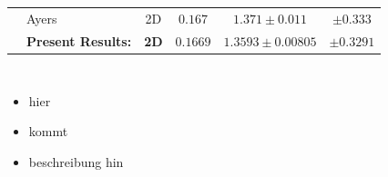 \begin{frame}[allowframebreaks]
{\begin{minipage}{\the\textwidth}
\begin{table}[htp]
\begin{tabular}{|l|l|c|c|c|c|}
					\rule{0pt}{2,3ex}& Ayers                  & 2D    &$ 0.167$     & $1.371 \pm 0.011 $ &$ \pm 0.333 $\\ \cline{2-6} 
					\rule{0pt}{2,3ex}& \textbf{Present Results:}                   & \textbf{2D}    & $\mathbf{0.1669}$     & $\mathbf{1.3593 \pm 0.00805}$  &  $\mathbf{\pm 0.3291}$ \\ \hline
				\end{tabular}	
			\end{table}
				\end{minipage}
			}
			\vspace{2cm}
			\begin{columns}[t]
				\column[]{4cm}
				\begin{itemize}
					\item hier
					\item kommt
					\item beschreibung hin
				\end{itemize}
				\column[]{8cm}
				\begin{figure}[htp]
					\centering		
					
				\end{figure}
			\end{columns}
			
		\end{frame}
